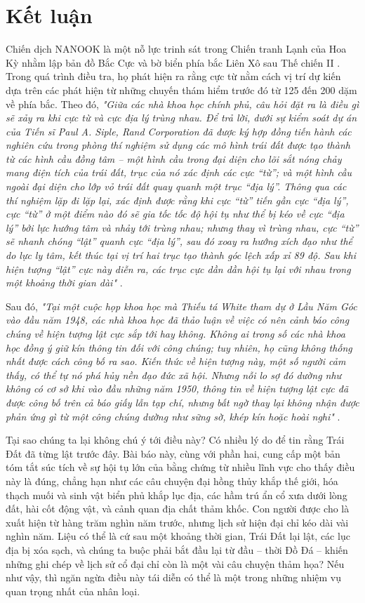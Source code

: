 \documentclass[10pt,twocolumn,letterpaper]{article}
\begin{document}
\section{Kết luận}

Chiến dịch NANOOK là một nỗ lực trinh sát trong Chiến tranh Lạnh của Hoa Kỳ nhằm lập bản đồ Bắc Cực và bờ biển phía bắc Liên Xô sau Thế chiến II \cite{137}. Trong quá trình điều tra, họ phát hiện ra rằng cực từ nằm cách vị trí dự kiến dựa trên các phát hiện từ những chuyến thám hiểm trước đó từ 125 đến 200 dặm về phía bắc. Theo đó, \textit{"Giữa các nhà khoa học chính phủ, câu hỏi đặt ra là điều gì sẽ xảy ra khi cực từ và cực địa lý trùng nhau. Để trả lời, dưới sự kiểm soát dự án của Tiến sĩ Paul A. Siple, Rand Corporation đã được ký hợp đồng tiến hành các nghiên cứu trong phòng thí nghiệm sử dụng các mô hình trái đất được tạo thành từ các hình cầu đồng tâm – một hình cầu trong đại diện cho lõi sắt nóng chảy mang điện tích của trái đất, trục của nó xác định các cực “từ”; và một hình cầu ngoài đại diện cho lớp vỏ trái đất quay quanh một trục “địa lý”. Thông qua các thí nghiệm lặp đi lặp lại, xác định được rằng khi cực “từ” tiến gần cực “địa lý”, cực “từ” ở một điểm nào đó sẽ gia tốc tốc độ hội tụ như thể bị kéo về cực “địa lý” bởi lực hướng tâm và nhảy tới trùng nhau; nhưng thay vì trùng nhau, cực “từ” sẽ nhanh chóng “lật” quanh cực “địa lý”, sau đó xoay ra hướng xích đạo như thể do lực ly tâm, kết thúc tại vị trí hai trục tạo thành góc lệch xấp xỉ 89 độ. Sau khi hiện tượng “lật” cực này diễn ra, các trục cực dần dần hội tụ lại với nhau trong một khoảng thời gian dài"} \cite{138,139}.

Sau đó, \textit{"Tại một cuộc họp khoa học mà Thiếu tá White tham dự ở Lầu Năm Góc vào đầu năm 1948, các nhà khoa học đã thảo luận về việc có nên cảnh báo công chúng về hiện tượng lật cực sắp tới hay không. Không ai trong số các nhà khoa học đồng ý giữ kín thông tin đối với công chúng; tuy nhiên, họ cũng không thống nhất được cách công bố ra sao. Kiến thức về hiện tượng này, một số người cảm thấy, có thể tự nó phá hủy nền đạo đức xã hội. Nhưng nỗi lo sợ đó dường như không có cơ sở khi vào đầu những năm 1950, thông tin về hiện tượng lật cực đã được công bố trên cả báo giấy lẫn tạp chí, nhưng bất ngờ thay lại không nhận được phản ứng gì từ một công chúng dường như sững sờ, khép kín hoặc hoài nghi"} \cite{138,139}.

Tại sao chúng ta lại không chú ý tới điều này? Có nhiều lý do để tin rằng Trái Đất đã từng lật trước đây. Bài báo này, cùng với phần hai, cung cấp một bản tóm tắt súc tích về sự hội tụ lớn của bằng chứng từ nhiều lĩnh vực cho thấy điều này là đúng, chẳng hạn như các câu chuyện đại hồng thủy khắp thế giới, hóa thạch muối và sinh vật biển phủ khắp lục địa, các hầm trú ẩn cổ xưa dưới lòng đất, hài cốt động vật, và cảnh quan địa chất thảm khốc. Con người được cho là xuất hiện từ hàng trăm nghìn năm trước, nhưng lịch sử hiện đại chỉ kéo dài vài nghìn năm. Liệu có thể là cứ sau một khoảng thời gian, Trái Đất lại lật, các lục địa bị xóa sạch, và chúng ta buộc phải bắt đầu lại từ đầu – thời Đồ Đá – khiến những ghi chép về lịch sử cổ đại chỉ còn là một vài câu chuyện thảm họa? Nếu như vậy, thì ngăn ngừa điều này tái diễn có thể là một trong những nhiệm vụ quan trọng nhất của nhân loại.
\end{document}
